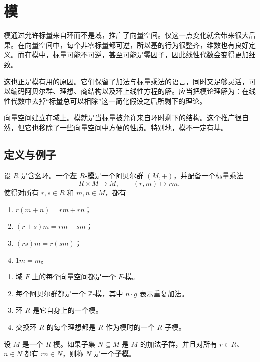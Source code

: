 \section{模}


模通过允许标量来自环而不是域，推广了向量空间。仅这一点变化就会带来很大后果。在向量空间中，每个非零标量都可逆，所以基的行为很整齐，维数也有良好定义。而在模中，标量可能不可逆，甚至可能是零因子，因此线性代数会变得更加细致。

这也正是模有用的原因。它们保留了加法与标量乘法的语言，同时又足够灵活，可以编码阿贝尔群、理想、商结构以及环上线性方程的解。应当把模论理解为：在线性代数中去掉“标量总可以相除”这一简化假设之后所剩下的理论。

向量空间建立在域上。模就是当标量被允许来自环时剩下的结构。这个推广很自然，但它也移除了一些向量空间中方便的性质。特别地，模不一定有基。

\subsection{定义与例子}

\begin{definition}[$R$-模]
设 $R$ 是含幺环。一个\textbf{左 $R$-模}是一个阿贝尔群 $(M,+)$，并配备一个标量乘法
\[
    R\times M\to M,
    \qquad
    (r,m)\mapsto rm,
\]
使得对所有 $r,s\in R$ 和 $m,n\in M$，都有
\begin{enumerate}
    \item $r(m+n)=rm+rn$；
    \item $(r+s)m=rm+sm$；
    \item $(rs)m=r(sm)$；
    \item $1m=m$。
\end{enumerate}
\end{definition}

\begin{example}[基本模]
\begin{enumerate}
    \item 域 $F$ 上的每个向量空间都是一个 $F$-模。
    \item 每个阿贝尔群都是一个 $\mathbb{Z}$-模，其中 $n\cdot g$ 表示重复加法。
    \item 环 $R$ 是它自身上的一个模。
    \item 交换环 $R$ 的每个理想都是 $R$ 作为模时的一个 $R$-子模。
\end{enumerate}
\end{example}

\begin{definition}[子模]
设 $M$ 是一个 $R$-模。如果子集 $N\subseteq M$ 是 $M$ 的加法子群，并且对所有 $r\in R$、$n\in N$ 都有 $rn\in N$，则称 $N$ 是一个\textbf{子模}。
\end{definition}

